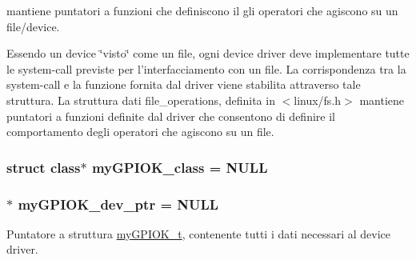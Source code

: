 mantiene puntatori a funzioni che definiscono il gli operatori che agiscono su un file/device. 

Essendo un device \char`\"{}visto\char`\"{} come un file, ogni device driver deve implementare tutte le system-\/call previste per l'interfacciamento con un file. La corrispondenza tra la system-\/call e la funzione fornita dal driver viene stabilita attraverso tale struttura. La struttura dati file\+\_\+operations, definita in $<$linux/fs.\+h$>$ mantiene puntatori a funzioni definite dal driver che consentono di definire il comportamento degli operatori che agiscono su un file. \hypertarget{group___kernel-_module_gaaf8d1bce7d6389684a037e94381c275c}{
\subsubsection[{my\+G\+P\+I\+O\+K\+\_\+class}]{\setlength{\rightskip}{0pt plus 5cm}struct class$\ast$ my\+G\+P\+I\+O\+K\+\_\+class = N\+U\+L\+L\hspace{0.3cm}{\ttfamily [static]}}}\label{group___kernel-_module_gaaf8d1bce7d6389684a037e94381c275c}
\hypertarget{group___kernel-_module_gae370dfc26b06b6cc24a7bcc152f4969e}{
\subsubsection[{my\+G\+P\+I\+O\+K\+\_\+dev\+\_\+ptr}]{$\ast$ my\+G\+P\+I\+O\+K\+\_\+dev\+\_\+ptr = N\+U\+L\+L}}\label{group___kernel-_module_gae370dfc26b06b6cc24a7bcc152f4969e}


Puntatore a struttura \hyperlink{structmy_g_p_i_o_k__t}{my\+G\+P\+I\+O\+K\+\_\+t}, contenente tutti i dati necessari al device driver. 

